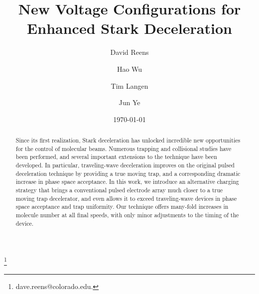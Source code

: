 \documentclass[%
 reprint,
 amsmath,amssymb,
 aps,
prl,
]{revtex4-1}
\begin{document}
\title{New Voltage Configurations for Enhanced Stark Deceleration}%

\author{David Reens}
\thanks{dave.reens@colorado.edu.}

\author{Hao Wu}

\author{Tim Langen}%

\author{Jun Ye}


\date{\today}



\begin{abstract}
Since its first realization, Stark deceleration has unlocked incredible new opportunities for the control of molecular beams. 
Numerous trapping and collisional studies have been performed, and several important extensions to the technique have been developed. 
In particular, traveling-wave deceleration improves on the original pulsed deceleration technique by providing a true moving trap, and a corresponding dramatic increase in phase space acceptance.
In this work, we introduce an alternative charging strategy that brings a conventional pulsed electrode array much closer to a true moving trap decelerator, and even allows it to exceed traveling-wave devices in phase space acceptance and trap uniformity.
Our technique offers many-fold increases in molecule number at all final speeds, with only minor adjustments to the timing of the device.
\end{abstract}

\maketitle
\end{document}
